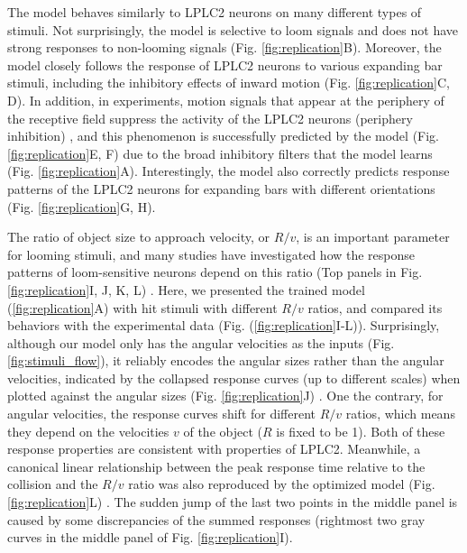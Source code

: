\documentclass[pdftex,9pt,lineno]{elife}
\begin{document}
The model behaves similarly to LPLC2 neurons on many different types of stimuli. Not surprisingly, the model is selective to loom signals and does not have strong responses to non-looming signals (Fig. \ref{fig:replication}B). Moreover, the model closely follows the response of LPLC2 neurons to various expanding bar stimuli, including the inhibitory effects of inward motion (Fig. \ref{fig:replication}C, D). In addition, in experiments, motion signals that appear at the periphery of the receptive field suppress the activity of the LPLC2 neurons (periphery inhibition) \citep{klapoetke2017ultra}, and this phenomenon is successfully predicted by the model (Fig. \ref{fig:replication}E, F) due to the broad inhibitory filters that the model learns (Fig. \ref{fig:replication}A). Interestingly, the model also correctly predicts response patterns of the LPLC2 neurons for expanding bars with different orientations (Fig. \ref{fig:replication}G, H). 

The ratio of object size to approach velocity, or $R/v$, is an important parameter for looming stimuli, and many studies have investigated how the response patterns of loom-sensitive neurons depend on this ratio (Top panels in Fig. \ref{fig:replication}I, J, K, L) \citep{gabbiani1999computation,von2017feature,ache2019neural}. Here, we presented the trained model (\ref{fig:replication}A) with hit stimuli with different $R/v$ ratios, and compared its behaviors with the experimental data (Fig. (\ref{fig:replication}I-L)). Surprisingly, although our model only has the angular velocities as the inputs (Fig. \ref{fig:stimuli_flow}), it reliably encodes the angular sizes rather than the angular velocities, indicated by the collapsed response curves (up to different scales) when plotted against the angular sizes (Fig. \ref{fig:replication}J) \citep{von2017feature}. One the contrary, for angular velocities, the response curves shift for different $R/v$ ratios, which means they depend on the velocities $v$ of the object ($R$ is fixed to be 1). Both of these response properties are consistent with properties of LPLC2. Meanwhile, a canonical linear relationship between the peak response time relative to the collision and the $R/v$ ratio was also reproduced by the optimized model (Fig. \ref{fig:replication}L) \citep{gabbiani1999computation,ache2019neural}. The sudden jump of the last two points in the middle panel is caused by some discrepancies of the summed responses (rightmost two gray curves in the middle panel of Fig. \ref{fig:replication}I). 
\end{document}
